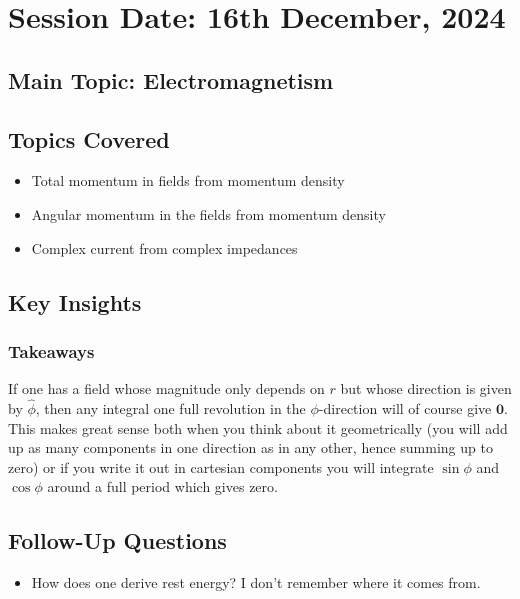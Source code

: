\section{Session Date: 16th December, 2024}
\subsection*{Main Topic: Electromagnetism}
\subsection*{Topics Covered}
\begin{itemize}
    \item Total momentum in fields from momentum density
    \item Angular momentum in the fields from momentum density
    \item Complex current from complex impedances
\end{itemize}

\subsection*{Key Insights}
\subsubsection*{Takeaways}
If one has a field whose magnitude only depends on \(r\) but whose direction is given by \(\hat{\phi}\), then any integral one full revolution in the \(\phi \)-direction will of course give \(\mathbf{0}\). This makes great sense both when you think about it geometrically (you will add up as many components in one direction as in any other, hence summing up to zero) or if you write it out in cartesian components you will integrate \(\sin \phi \) and \(\cos \phi \) around a full period which gives zero.

\subsection*{Follow-Up Questions}
\begin{itemize}
    \item How does one derive rest energy? I don't remember where it comes from.
\end{itemize}
